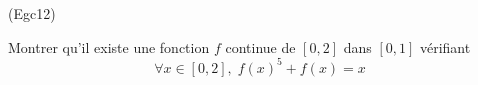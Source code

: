 \begin{tiny}(Egc12)\end{tiny}
Montrer qu'il existe une fonction $f$ continue de $\left[ 0,2 \right]$ dans $\left[ 0,1 \right]$ vérifiant
\[
 \forall x \in \left[ 0,2 \right], \;f(x)^5 + f(x) = x
\]
